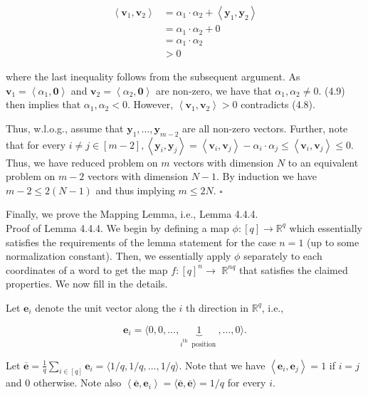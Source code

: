 \documentclass[10pt]{article}
\begin{document}
$$
\begin{aligned}
\left\langle\mathbf{v}_{1}, \mathbf{v}_{2}\right\rangle & =\alpha_{1} \cdot \alpha_{2}+\left\langle\mathbf{y}_{1}, \mathbf{y}_{2}\right\rangle \\
& =\alpha_{1} \cdot \alpha_{2}+0 \\
& =\alpha_{1} \cdot \alpha_{2} \\
& >0
\end{aligned}
$$

where the last inequality follows from the subsequent argument. As $\mathbf{v}_{1}=\left\langle\alpha_{1}, \mathbf{0}\right\rangle$ and $\mathbf{v}_{2}=\left\langle\alpha_{2}, \mathbf{0}\right\rangle$ are non-zero, we have that $\alpha_{1}, \alpha_{2} \neq 0$. (4.9) then implies that $\alpha_{1}, \alpha_{2}<0$. However, $\left\langle\mathbf{v}_{1}, \mathbf{v}_{2}\right\rangle>0$ contradicts (4.8).

Thus, w.l.o.g., assume that $\mathbf{y}_{1}, \ldots, \mathbf{y}_{m-2}$ are all non-zero vectors. Further, note that for every $i \neq j \in[m-2],\left\langle\mathbf{y}_{i}, \mathbf{y}_{j}\right\rangle=\left\langle\mathbf{v}_{i}, \mathbf{v}_{j}\right\rangle-\alpha_{i} \cdot \alpha_{j} \leq\left\langle\mathbf{v}_{i}, \mathbf{v}_{j}\right\rangle \leq 0$. Thus, we have reduced problem on $m$ vectors with dimension $N$ to an equivalent problem on $m-2$ vectors with dimension $N-1$. By induction we have $m-2 \leq 2(N-1)$ and thus implying $m \leq 2 N$. \(\square\)

Finally, we prove the Mapping Lemma, i.e., Lemma 4.4.4.\\
Proof of Lemma 4.4.4. We begin by defining a map $\phi:[q] \rightarrow \mathbb{R}^{q}$ which essentially satisfies the requirements of the lemma statement for the case $n=1$ (up to some normalization constant). Then, we essentially apply $\phi$ separately to each coordinates of a word to get the map $f:[q]^{n} \rightarrow$ $\mathbb{R}^{n q}$ that satisfies the claimed properties. We now fill in the details.

Let $\mathbf{e}_{i}$ denote the unit vector along the $i$ th direction in $\mathbb{R}^{q}$, i.e.,

$$
\mathbf{e}_{i}=\langle 0,0, \ldots, \underbrace{1}_{i^{\text {th }} \text { position }}, \ldots, 0\rangle .
$$

Let $\overline{\mathbf{e}}=\frac{1}{q} \sum_{i \in[q]} \mathbf{e}_{i}=\langle 1 / q, 1 / q, \ldots, 1 / q\rangle$. Note that we have $\left\langle\mathbf{e}_{i}, \mathbf{e}_{j}\right\rangle=1$ if $i=j$ and 0 otherwise. Note also $\left\langle\overline{\mathbf{e}}, \mathbf{e}_{i}\right\rangle=\langle\overline{\mathbf{e}}, \overline{\mathbf{e}}\rangle=1 / q$ for every $i$.
\end{document}
